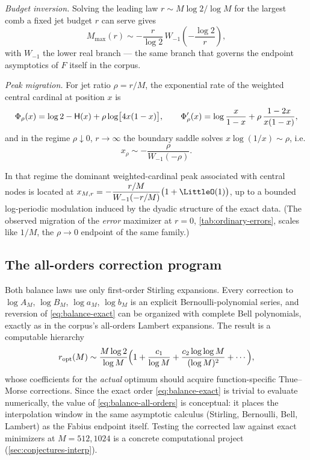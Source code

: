 \emph{Budget inversion.}  Solving the leading law
$r\sim M\log2/\log M$ for the largest comb a fixed jet budget $r$ can
serve gives
\begin{equation}
 M_{\max}(r)\sim-\frac{r}{\log2}\,
 W_{-1}\!\left(-\frac{\log2}{r}\right),
 \label{eq:lambert-budget}
\end{equation}
with $W_{-1}$ the lower real branch --- the same branch that governs
the endpoint asymptotics of $F$ itself in the corpus.

\emph{Peak migration.}  For jet ratio $\rho=r/M$, the exponential
rate of the weighted central cardinal at position $x$ is
\begin{equation}
 \Phi_\rho(x)=\log2-\mathsf H(x)+\rho\log\bigl[4x(1-x)\bigr],
 \qquad
 \Phi_\rho'(x)=\log\frac{x}{1-x}+\rho\,\frac{1-2x}{x(1-x)},
 \label{eq:rate-function}
\end{equation}
and in the regime $\rho\downarrow0$, $r\to\infty$ the boundary saddle
solves $x\log(1/x)\sim\rho$, i.e.
\begin{equation}
 x_\rho\sim-\frac{\rho}{W_{-1}(-\rho)}.
 \label{eq:lambert-peak}
\end{equation}

\begin{conjecture}
\label{conj:lambert-peak}
In that regime the dominant weighted-cardinal peak associated with
central nodes is located at
$x_{M,r}=-\dfrac{r/M}{W_{-1}(-r/M)}\bigl(1+\LittleO(1)\bigr)$, up to a
bounded log-periodic modulation induced by the dyadic structure of the
exact data.  (The observed migration of the \emph{error} maximizer at
$r=0$, \cref{tab:ordinary-errors}, scales like $1/M$, the
$\rho\to0$ endpoint of the same family.)
\end{conjecture}

\subsection{The all-orders correction program}

Both balance laws use only first-order Stirling expansions.  Every
correction to $\log A_M$, $\log B_M$, $\log a_M$, $\log b_M$ is an
explicit Bernoulli-polynomial series, and reversion of
\eqref{eq:balance-exact} can be organized with complete Bell
polynomials, exactly as in the corpus's all-orders Lambert
expansions.  The result is a computable hierarchy
\begin{equation}
 r_{\mathrm{opt}}(M)
 \sim\frac{M\log2}{\log M}
 \Bigl(1+\frac{c_1}{\log M}
 +\frac{c_2\log\log M}{(\log M)^{2}}+\cdots\Bigr),
 \label{eq:balance-all-orders}
\end{equation}
whose coefficients for the \emph{actual} optimum should acquire
function-specific Thue--Morse corrections.  Since the exact order
\eqref{eq:balance-exact} is trivial to evaluate numerically, the
value of \eqref{eq:balance-all-orders} is conceptual: it places the
interpolation window in the same asymptotic calculus (Stirling,
Bernoulli, Bell, Lambert) as the Fabius endpoint itself.  Testing the
corrected law against exact minimizers at $M=512,1024$ is a concrete
computational project (\cref{sec:conjectures-interp}).

